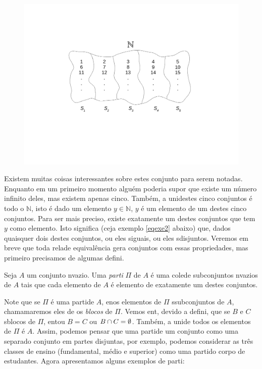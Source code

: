 \begin{figure}[h]
\begin{center}
\includegraphics[width=13cm,trim={3cm 6.5cm 3cm 4cm},clip]{./figuras/figure25.pdf}
\end{center}
\end{figure}

Existem muitas coisas interessantes sobre estes conjunto para serem notadas. Enquanto em um primeiro momento algu\'em poderia supor que existe um n\'umero infinito deles, mas existem apenas cinco. Tamb\'em, a uni\ao destes cinco conjuntos \'e todo o $\mathbb{N}$, isto \'e dado um elemento $y\in\mathbb{N}$, $y$ \'e um elemento de um destes cinco conjuntos. Para ser mais preciso, existe exatamente um destes conjuntos que tem $y$ como elemento. Isto significa (ceja exemplo \ref{eqexe2} abaixo) que, dados quaisquer dois destes conjuntos, ou eles s\ao iguais, ou eles s\ao disjuntos. Veremos em breve que toda rela\cao de equival\^encia gera conjuntos com essas propriedades, mas primeiro precisamos de algumas defini\cois. 
\begin{definb}
Seja $A$ um conjunto n\ao vazio. Uma {\it parti\cao} $\Pi$ de $A$ \'e uma cole\cao de subconjuntos n\ao vazios de $A$ tais que cada elemento de $A$ \'e elemento de exatamente um destes conjuntos.
\end{definb}

Note que se $\Pi$ \'e uma parti\cao de $A$, en\tao os elementos de $\Pi$ s\ao subconjuntos de $A$, chamamaremos eles de os {\it blocos} de $\Pi$. Vemos ent\aoi, devido a defini\caoi, que se $B$ e $C$ s\ao blocos de $\Pi$, ent\ao ou $B=C$ ou $B\cap C=\emptyset$. Tamb\'em, a uni\ao de todos os elementos de $\Pi$ \'e $A$. Assim, podemos pensar que uma parti\cao de um conjunto como uma separa\cao do conjunto em partes disjuntas, por exemplo, podemos considerar as tr\^es classes de ensino (fundamental, m\'edio e superior) como uma parti\cao do corpo de estudantes. Agora apresentamos alguns exemplos de parti\cois:

